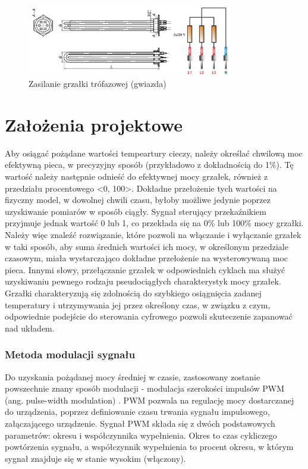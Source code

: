 \documentclass[a4paper,twoside,12pt]{book}
\begin{document}
\begin{figure}[h]
	\centering
	\includegraphics[width=0.8\textwidth]{./img/threePhaseHeater.jpg}
	\caption{Zasilanie grzałki trófazowej (gwiazda) \cite{egniazdka, intmax}}
	\label{fig:threePhaseHeater}
\end{figure}

\chapter{Założenia projektowe}
\label{ch:03}
Aby osiągać pożądane wartości tempeartury cieczy, należy określać chwilową moc efektywną pieca, w precyzyjny sposób (przykładowo z dokładnością do 1\%). Tę wartość należy następnie odnieść do efektywnej mocy grzałek, również z przedziału procentowego <0, 100>. Dokładne przełożenie tych wartości na fizyczny model, w dowolnej chwili czasu, byłoby możliwe jedynie poprzez uzyskiwanie pomiarów w sposób ciągły. Sygnał sterujący przekaźnikiem przyjmuje jednak wartość 0 lub 1, co przekłada się na 0\% lub 100\% mocy grzałki. Należy więc znaleźć rozwiązanie, które pozwoli na włączanie i wyłączanie grzałek w taki sposób, aby suma średnich wartości ich mocy, w określonym przedziale czasowym, miała wystarczająco dokładne przełożenie na wysterowywaną moc pieca. Innymi słowy, przełączanie grzałek w odpowiednich cyklach ma służyć uzyskiwaniu pewnego rodzaju pseudociągłych charakterystyk mocy grzałek. Grzałki charakteryzują się zdolnością do szybkiego osiągnięcia zadanej temperatury i utrzymywania jej przez określony czas, w związku z czym, odpowiednie podejście do sterowania cyfrowego pozwoli skuteczenie zapanować nad układem.

\subsection{Metoda modulacji sygnału}
Do uzyskania pożądanej mocy średniej w czasie, zastosowany zostanie powszechnie znany sposób modulacji - modulacja szerokości impulsów PWM (ang. pulse-width modulation) \cite{sun2012pulse}. PWM pozwala na regulację mocy dostarczanej do urządzenia, poprzez definiowanie czasu trwania sygnału impulsowego, załączającego urządzenie. Sygnał PWM składa się z dwóch podstawowych parametrów: okresu i współczynnika wypełnienia. Okres to czas cykliczego powtórzenia sygnału, a współczynnik wypełnienia to procent okresu, w którym sygnał znajduje się w stanie wysokim (włączony).
\end{document}
